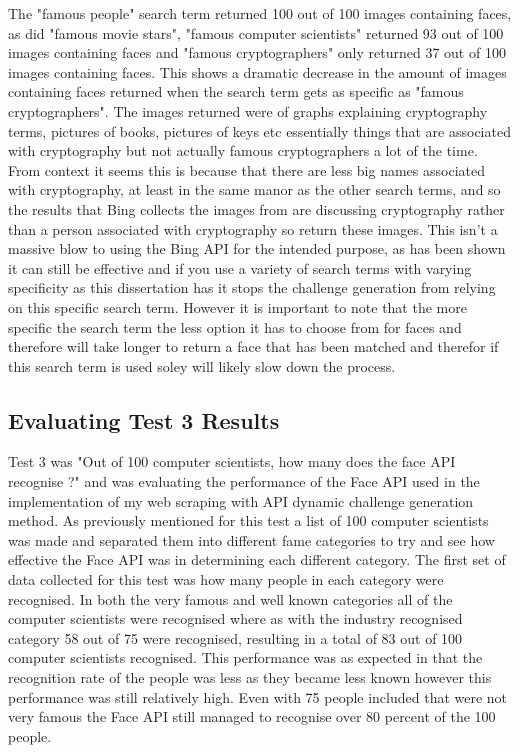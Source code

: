 \documentclass[12pt,a4paper]{article}
\begin{document}
The "famous people" search term returned 100 out of 100 images containing faces, as did "famous movie stars", "famous computer scientists" returned 93 out of 100 images containing faces and "famous cryptographers" only returned 37 out of 100 images containing faces. This shows a dramatic decrease in the amount of images containing faces returned when the search term gets as specific as "famous cryptographers". The images returned were of graphs explaining cryptography terms, pictures of books, pictures of keys etc essentially things that are associated with cryptography but not actually famous cryptographers a lot of the time. From context it seems this is because that there are less big names associated with cryptography, at least in the same manor as the other search terms, and so the results that Bing collects the images from are discussing cryptography rather than a person associated with cryptography so return these images. This isn't a massive blow to using the Bing API for the intended purpose, as has been shown it can still be effective and if you use a variety of search terms with varying specificity as this dissertation has it stops the challenge generation from relying on this specific search term. However it is important to note that the more specific the search term the less option it has to choose from for faces and therefore will take longer to return a face that has been matched and therefor if this search term is used soley will likely slow down the process. 

\subsection{Evaluating Test 3 Results}  
Test 3 was "Out of 100 computer scientists, how many does the face API recognise ?" and was evaluating the performance of the Face API used in the implementation of my web scraping with API dynamic challenge generation method. 
As previously mentioned for this test a list of 100 computer scientists was made and separated them into different fame categories to try and see how effective the Face API was in determining each different category. The first set of data collected for this test was how many people in each category were recognised. In both the very famous and well known categories all of the computer scientists were recognised where as with the industry recognised category 58 out of 75 were recognised, resulting in a total of 83 out of 100 computer scientists recognised. This performance was as expected in that the recognition rate of the people was less as they became less known however this performance was still relatively high. Even with 75 people included that were not very famous the Face API still managed to recognise over 80 percent of the 100 people.  
\end{document}
